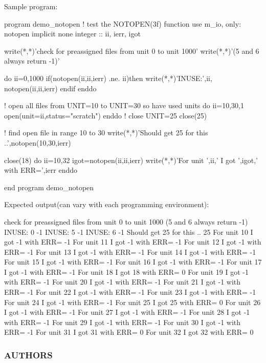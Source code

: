 \begin{DoxyVerb}Sample program:

 program demo_notopen ! test the NOTOPEN(3f) function
 use m_io, only: notopen
 implicit none
 integer :: ii, ierr, igot

 write(*,*)'check for preassigned files from unit 0 to unit 1000'
 write(*,*)'(5 and 6 always return -1)'

 do ii=0,1000
    if(notopen(ii,ii,ierr) .ne. ii)then
       write(*,*)'INUSE:',ii, notopen(ii,ii,ierr)
    endif
 enddo

 ! open all files from UNIT=10 to UNIT=30 so have used units
 do ii=10,30,1
   open(unit=ii,status="scratch")
 enddo
 ! close UNIT=25
 close(25)

 ! find open file in range 10 to 30
 write(*,*)'Should get 25 for this ..',notopen(10,30,ierr)

 close(18)
 do ii=10,32
   igot=notopen(ii,ii,ierr)
   write(*,*)'For unit ',ii,' I got ',igot,' with ERR=',ierr
 enddo

 end program demo_notopen

Expected output(can vary with each programming environment):

   check for preassigned files from unit 0 to unit 1000
   (5 and 6 always return -1)
   INUSE:    0    -1
   INUSE:    5    -1
   INUSE:    6    -1
   Should get 25 for this .. 25
   For  unit  10  I  got  -1  with  ERR=  -1
   For  unit  11  I  got  -1  with  ERR=  -1
   For  unit  12  I  got  -1  with  ERR=  -1
   For  unit  13  I  got  -1  with  ERR=  -1
   For  unit  14  I  got  -1  with  ERR=  -1
   For  unit  15  I  got  -1  with  ERR=  -1
   For  unit  16  I  got  -1  with  ERR=  -1
   For  unit  17  I  got  -1  with  ERR=  -1
   For  unit  18  I  got  18  with  ERR=   0
   For  unit  19  I  got  -1  with  ERR=  -1
   For  unit  20  I  got  -1  with  ERR=  -1
   For  unit  21  I  got  -1  with  ERR=  -1
   For  unit  22  I  got  -1  with  ERR=  -1
   For  unit  23  I  got  -1  with  ERR=  -1
   For  unit  24  I  got  -1  with  ERR=  -1
   For  unit  25  I  got  25  with  ERR=   0
   For  unit  26  I  got  -1  with  ERR=  -1
   For  unit  27  I  got  -1  with  ERR=  -1
   For  unit  28  I  got  -1  with  ERR=  -1
   For  unit  29  I  got  -1  with  ERR=  -1
   For  unit  30  I  got  -1  with  ERR=  -1
   For  unit  31  I  got  31  with  ERR=   0
   For  unit  32  I  got  32  with  ERR=   0
\end{DoxyVerb}


\subsubsection*{A\+U\+T\+H\+O\+RS}

